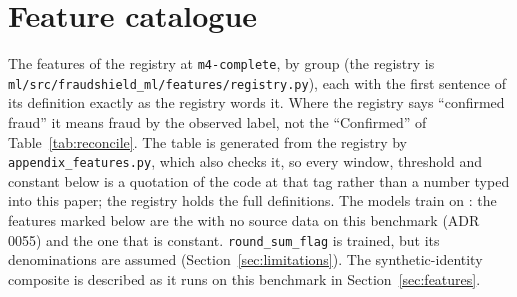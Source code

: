 \section{Feature catalogue}
\label{app:features}

The \nFeatures{} features of the registry at \texttt{m4-complete}, by group (the registry is
\texttt{ml/src/\allowbreak fraudshield\_ml/\allowbreak features/\allowbreak registry.py}), each with the first sentence of its definition exactly as the registry
words it. Where the registry says ``confirmed fraud'' it means fraud by the observed label, not the
``Confirmed'' of Table~\ref{tab:reconcile}. The table is generated from the registry by \texttt{appendix\_features.py}, which also
checks it, so every window, threshold and constant below is a quotation of the code at that tag
rather than a number typed into this paper; the registry holds the full definitions. The models
train on \nTrainableFeatures{}: the features marked below are the \nNoSourceFeatures{} with no source
data on this benchmark (ADR 0055) and the one that is constant. \texttt{round\_sum\_flag} is trained,
but its denominations are assumed (Section~\ref{sec:limitations}). The synthetic-identity composite is
described as it runs on this benchmark in Section~\ref{sec:features}.

\begin{small}

\end{small}
